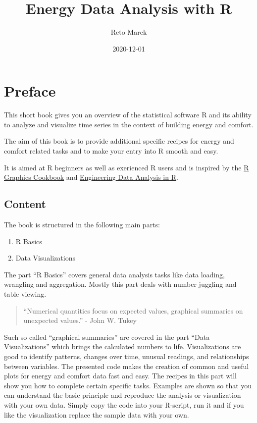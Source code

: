 \documentclass[
  a4paperpaper,
]{book}
\title{Energy Data Analysis with R}
\author{Reto Marek}
\date{2020-12-01}
\providecommand{\tightlist}{%
  \setlength{\itemsep}{0pt}\setlength{\parskip}{0pt}}
\begin{document}
\maketitle

{
\setcounter{tocdepth}{1}
\tableofcontents
}
\hypertarget{preface}{%
\chapter{Preface}\label{preface}}

This short book gives you an overview of the statistical software R and its ability to analyze and visualize time series in the context of building energy and comfort.

The aim of this book is to provide additional specific recipes for energy and comfort related tasks and to make your entry into R smooth and easy.

It is aimed at R beginners as well as exerienced R users and is inspired by the \href{https://r-graphics.org/}{R Graphics Cookbook} and \href{https://smogdr.github.io/edar_coursebook/}{Engineering Data Analysis in R}.

\hypertarget{content}{%
\section{Content}\label{content}}

The book is structured in the following main parts:

\begin{enumerate}
\def\labelenumi{\arabic{enumi}.}
\tightlist
\item
  R Basics
\item
  Data Visualizations
\end{enumerate}

The part ``R Basics'' covers general data analysis tasks like data loading, wrangling and aggregation. Mostly this part deals with number juggling and table viewing.

\begin{quote}
``Numerical quantities focus on expected values, graphical summaries on unexpected values.'' - John W. Tukey
\end{quote}

Such so called ``graphical summaries'' are covered in the part ``Data Visualizations'' which brings the calculated numbers to life. Visualizations are good to identify patterns, changes over time, unusual readings, and relationships between variables. The presented code makes the creation of common and useful plots for energy and comfort data fast and easy.
The recipes in this part will show you how to complete certain specific tasks. Examples are shown so that you can understand the basic principle and reproduce the analysis or visualization with your own data. Simply copy the code into your R-script, run it and if you like the visualization replace the sample data with your own.
\end{document}
